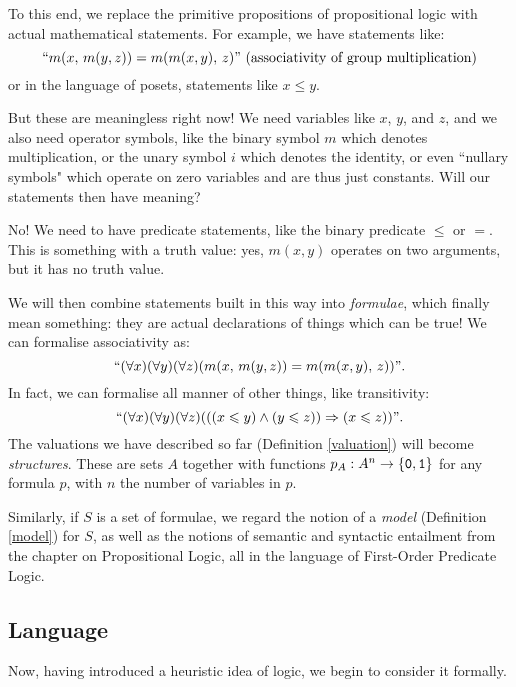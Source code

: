 \documentclass{article}
\begin{document}
To this end, we replace the primitive propositions of propositional logic with actual mathematical statements. For example, we have statements like:
\[
``m(x, \, m(y, z)) = m(m(x, y), \, z)" \text{ (associativity of group multiplication)}
\]
or in the language of posets, statements like $x \leq y$.

But these are meaningless right now! We need variables like $x$, $y$, and $z$, and we also need operator symbols, like the binary symbol $m$ which denotes multiplication, or the unary symbol $i$ which denotes the identity, or even ``nullary symbols" which operate on zero variables and are thus just constants. Will our statements then have meaning?

No!  We need to have predicate statements, like the binary predicate $\leq$ or $=$. This is something with a truth value: yes, $m(x, y)$ operates on two arguments, but it has no truth value.

We will then combine statements built in this way into \textit{formulae}, which finally mean something: they are actual declarations of things which can be true! We can formalise associativity as:
\[
``(\forall x)(\forall y)(\forall z)(m(x, \, m(y, z)) = m(m(x, y), \, z))".
\]
In fact, we can formalise all manner of other things, like transitivity:
\[
``(\forall x)(\forall y)(\forall z)(((x \leqslant y) \land (y \leqslant z)) \Rightarrow (x \leqslant z))".
\]
The valuations we have described so far (Definition \ref{valuation}) will become \textit{structures}. These are sets $A$ together with functions $p_A: A^n \to \left\lbrace \texttt{0}, \texttt{1} \right\rbrace$ for any formula $p$, with $n$ the number of variables in $p$.

Similarly, if $S$ is a set of formulae, we regard the notion of a \textit{model} (Definition \ref{model}) for $S$, as well as the notions of semantic and syntactic entailment from the chapter on Propositional Logic, all in the language of First-Order Predicate Logic.


\subsection{Language}

Now, having introduced a heuristic idea of logic, we begin to consider it formally.
\end{document}
